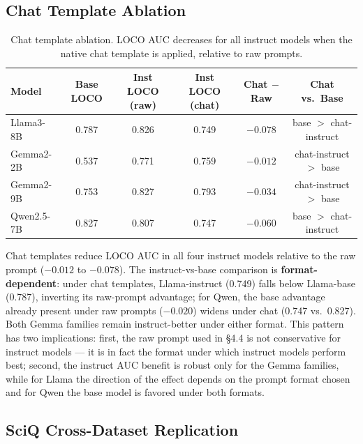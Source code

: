 \documentclass[11pt]{article}
\begin{document}
\subsection{Chat Template Ablation}

\begin{table}[h]
\centering
\small
\begin{tabular}{lccccc}
\toprule
Model & Base LOCO & Inst LOCO (raw) & Inst LOCO (chat) & Chat $-$ Raw & Chat vs.\ Base \\
\midrule
Llama3-8B  & 0.787 & 0.826 & 0.749 & $-0.078$ & base $>$ chat-instruct \\
Gemma2-2B  & 0.537 & 0.771 & 0.759 & $-0.012$ & chat-instruct $>$ base \\
Gemma2-9B  & 0.753 & 0.827 & 0.793 & $-0.034$ & chat-instruct $>$ base \\
Qwen2.5-7B & 0.827 & 0.807 & 0.747 & $-0.060$ & base $>$ chat-instruct \\
\bottomrule
\end{tabular}
\caption{Chat template ablation. LOCO AUC decreases for all instruct models when the native chat template is applied, relative to raw prompts.}
\label{tab:chat}
\end{table}

Chat templates reduce LOCO AUC in all four instruct models relative to the raw prompt ($-0.012$ to $-0.078$). The instruct-vs-base comparison is \textbf{format-dependent}: under chat templates, Llama-instruct (0.749) falls below Llama-base (0.787), inverting its raw-prompt advantage; for Qwen, the base advantage already present under raw prompts ($-0.020$) widens under chat (0.747 vs.\ 0.827). Both Gemma families remain instruct-better under either format. This pattern has two implications: first, the raw prompt used in \S4.4 is not conservative for instruct models --- it is in fact the format under which instruct models perform best; second, the instruct AUC benefit is robust only for the Gemma families, while for Llama the direction of the effect depends on the prompt format chosen and for Qwen the base model is favored under both formats.

\subsection{SciQ Cross-Dataset Replication}
\end{document}
